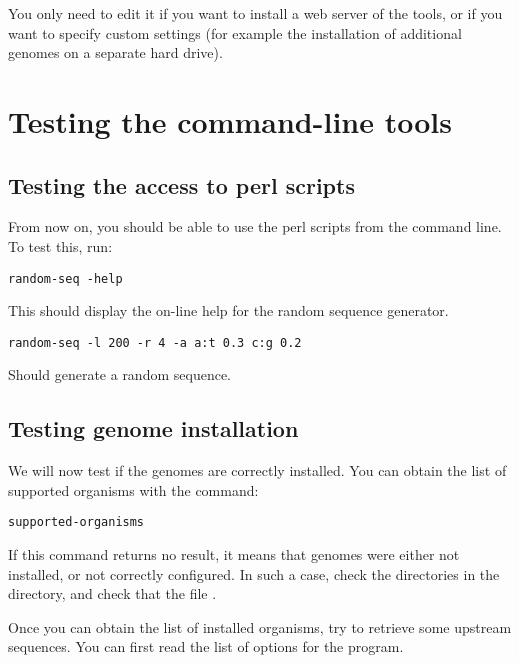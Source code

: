 \documentclass{article}
\begin{document}
You only need to edit it if you want to install a web server of the
tools, or if you want to specify custom settings (for example the
installation of additional genomes on a separate hard drive).





\section{Testing the command-line tools}

\subsection{Testing the access to perl scripts}

From now on, you should be able to use the perl scripts from the
command line. To test this, run: 

\begin{verbatim}
random-seq -help
\end{verbatim}

This should display the on-line help for the random sequence
generator. 

\begin{verbatim}
random-seq -l 200 -r 4 -a a:t 0.3 c:g 0.2
\end{verbatim}

Should generate a random sequence.

\subsection{Testing genome installation}

We will now test if the genomes are correctly installed. You can
obtain the list of supported organisms with the command:

\begin{verbatim}
supported-organisms
\end{verbatim}

If this command returns no result, it means that genomes were either
not installed, or not correctly configured. In such a case, check the
directories in the  directory, and check that the
file .

Once you can obtain the list of installed organisms, try to retrieve
some upstream sequences. You can first read the list of options for the
 program.
\end{document}
